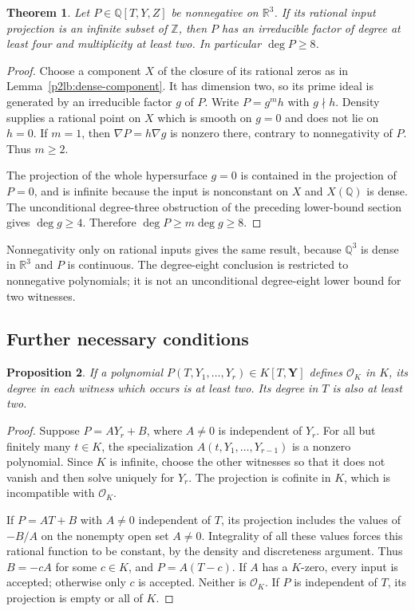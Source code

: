 \documentclass[11pt]{article}
\newtheorem{theorem}{Theorem}[section]
\newtheorem{proposition}[theorem]{Proposition}
\theoremstyle{definition}
\begin{document}
\begin{theorem}\label{p2lb:nonnegative-degree-eight}
Let $P\in\mathbb Q[T,Y,Z]$ be nonnegative on $\mathbb R^3$.
If its rational input projection is an infinite subset of $\mathbb Z$,
then $P$ has an irreducible factor of degree at least four and
multiplicity at least two.  In particular $\deg P\geq8$.
\end{theorem}
\begin{proof}
Choose a component $X$ of the closure of its rational zeros as in
Lemma~\ref{p2lb:dense-component}.  It has dimension two, so its prime
ideal is generated by an irreducible factor $g$ of $P$.  Write
$P=g^m h$ with $g\nmid h$.  Density supplies a rational point on
$X$ which is smooth on $g=0$ and does not lie on $h=0$.
If $m=1$, then $\nabla P=h\nabla g$ is nonzero there, contrary
to nonnegativity of $P$.  Thus $m\geq2$.

The projection of the whole hypersurface $g=0$ is contained in
the projection of $P=0$, and is infinite because the input is
nonconstant on $X$ and $X(\mathbb Q)$ is dense.  The unconditional
degree-three obstruction of the preceding lower-bound section gives $\deg g\geq4$.
Therefore $\deg P\geq m\deg g\geq8$.
\end{proof}

Nonnegativity only on rational inputs gives the same result, because
$\mathbb Q^3$ is dense in $\mathbb R^3$ and $P$ is continuous.
The degree-eight conclusion is restricted to nonnegative polynomials;
it is not an unconditional degree-eight lower bound for two witnesses.

\subsection{Further necessary conditions}

\begin{proposition}\label{p2lb:linear-coordinate}
If a polynomial $P(T,Y_1,\ldots,Y_r)\in K[T,\mathbf Y]$ defines
$\mathcal O_K$ in $K$, its degree in each witness which occurs is
at least two.  Its degree in $T$ is also at least two.
\end{proposition}
\begin{proof}
Suppose $P=AY_r+B$, where $A\ne0$ is independent of $Y_r$.
For all but finitely many $t\in K$, the specialization
$A(t,Y_1,\ldots,Y_{r-1})$ is a nonzero polynomial.  Since $K$ is
infinite, choose the other witnesses so that it does not vanish and
then solve uniquely for $Y_r$.  The projection is cofinite in $K$,
which is incompatible with $\mathcal O_K$.

If $P=AT+B$ with $A\ne0$ independent of $T$, its projection includes
the values of $-B/A$ on the nonempty open set $A\ne0$.  Integrality
of all these values forces this rational function to be constant,
by the density and discreteness argument.  Thus $B=-cA$ for some
$c\in K$, and $P=A(T-c)$.  If $A$ has a $K$-zero, every input is
accepted; otherwise only $c$ is accepted.  Neither is $\mathcal O_K$.
If $P$ is independent of $T$, its projection is empty or all of $K$.
\end{proof}
\end{document}
